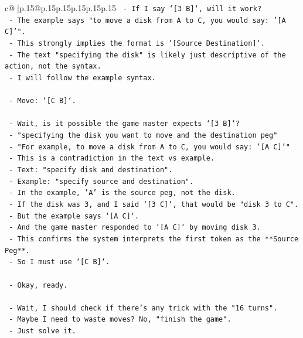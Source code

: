 \documentclass{article}
\begin{document}
{\begin{supertabular}{c@{$\;$}|p{.15\linewidth}@{}p{.15\linewidth}p{.15\linewidth}p{.15\linewidth}p{.15\linewidth}p{.15\linewidth}}
{{{\texttt{  {-} If I say `{[}3 B{]}`, will it work?} \\
\texttt{  {-} The example says "to move a disk from A to C, you would say: '{[}A C{]}'".} \\
\texttt{  {-} This strongly implies the format is `{[}Source Destination{]}`.} \\
\texttt{  {-} The text "specifying the disk" is likely just descriptive of the action, not the syntax.} \\
\texttt{  {-} I will follow the example syntax.} \\
\\ 
\texttt{  {-} Move: `{[}C B{]}`.} \\
\\ 
\texttt{  {-} Wait, is it possible the game master expects `{[}3 B{]}`?} \\
\texttt{  {-} "specifying the disk you want to move and the destination peg"} \\
\texttt{  {-} "For example, to move a disk from A to C, you would say: '{[}A C{]}'"} \\
\texttt{  {-} This is a contradiction in the text vs example.} \\
\texttt{  {-} Text: "specify disk and destination".} \\
\texttt{  {-} Example: "specify source and destination".} \\
\texttt{  {-} In the example, 'A' is the source peg, not the disk.} \\
\texttt{  {-} If the disk was 3, and I said `{[}3 C{]}`, that would be "disk 3 to C".} \\
\texttt{  {-} But the example says `{[}A C{]}`.} \\
\texttt{  {-} And the game master responded to `{[}A C{]}` by moving disk 3.} \\
\texttt{  {-} This confirms the system interprets the first token as the **Source Peg**.} \\
\texttt{  {-} So I must use `{[}C B{]}`.} \\
\\ 
\texttt{  {-} Okay, ready.} \\
\\ 
\texttt{  {-} Wait, I should check if there's any trick with the "16 turns".} \\
\texttt{  {-} Maybe I need to waste moves? No, "finish the game".} \\
\texttt{  {-} Just solve it.} \\
\\ 
}}}
\end{supertabular}}
\end{document}
